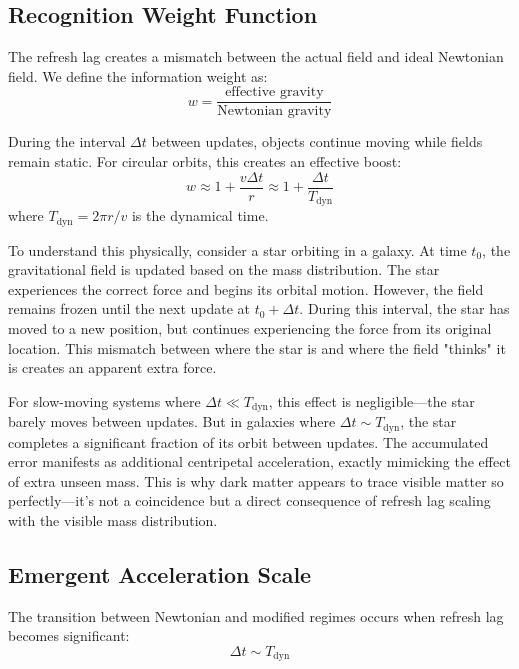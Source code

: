 \documentclass[twocolumn,prd,amsmath,amssymb,aps,superscriptaddress,nofootinbib]{revtex4-2}
\begin{document}
\subsection{Recognition Weight Function}

The refresh lag creates a mismatch between the actual field and ideal Newtonian field. We define the information weight as:
\begin{equation}
w = \frac{\text{effective gravity}}{\text{Newtonian gravity}}
\end{equation}

During the interval $\Delta t$ between updates, objects continue moving while fields remain static. For circular orbits, this creates an effective boost:
\begin{equation}
w \approx 1 + \frac{v \Delta t}{r} \approx 1 + \frac{\Delta t}{T_{\text{dyn}}}
\end{equation}
where $T_{\text{dyn}} = 2\pi r/v$ is the dynamical time.

To understand this physically, consider a star orbiting in a galaxy. At time $t_0$, the gravitational field is updated based on the mass distribution. The star experiences the correct force and begins its orbital motion. However, the field remains frozen until the next update at $t_0 + \Delta t$. During this interval, the star has moved to a new position, but continues experiencing the force from its original location. This mismatch between where the star is and where the field "thinks" it is creates an apparent extra force.

For slow-moving systems where $\Delta t \ll T_{\text{dyn}}$, this effect is negligible---the star barely moves between updates. But in galaxies where $\Delta t \sim T_{\text{dyn}}$, the star completes a significant fraction of its orbit between updates. The accumulated error manifests as additional centripetal acceleration, exactly mimicking the effect of extra unseen mass. This is why dark matter appears to trace visible matter so perfectly---it's not a coincidence but a direct consequence of refresh lag scaling with the visible mass distribution.

\subsection{Emergent Acceleration Scale}

The transition between Newtonian and modified regimes occurs when refresh lag becomes significant:
\begin{equation}
\Delta t \sim T_{\text{dyn}}
\end{equation}
\end{document}
